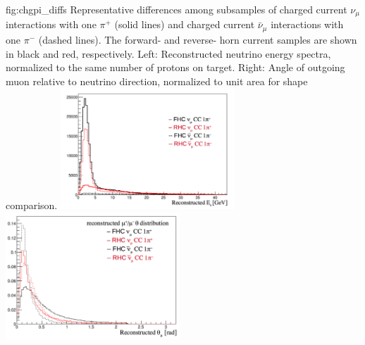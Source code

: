 \begin{dunefigure}{fig:chgpi_diffs}
{Representative differences among subsamples of charged current $\nu_{\mu}$ interactions with one $\pi^+$ (solid lines) and charged current $\bar{\nu}_{\mu}$ interactions with one $\pi^-$ (dashed lines). The forward- and reverse- horn current samples are shown in black and red, respectively. Left: Reconstructed neutrino energy spectra, normalized to the same number of protons on target. Right: Angle of outgoing muon relative to neutrino direction, normalized to unit area for shape comparison.}
    \includegraphics[width=0.49\textwidth]{graphics/Ereco_numu_1pi.png}
    \includegraphics[width=0.49\textwidth]{graphics/mu_theta_numu_6.png}
\end{dunefigure}

